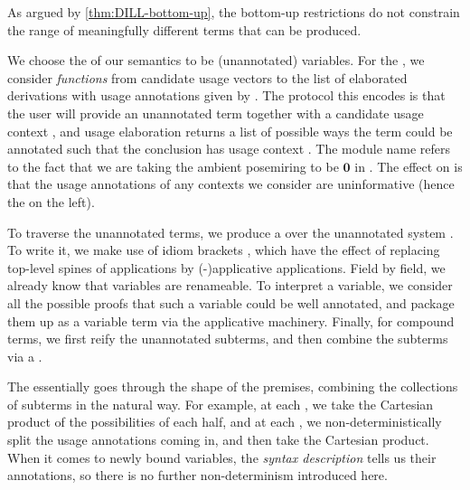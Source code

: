 \begin{example}
  \begin{samepage}
  \end{samepage}

  As argued by \cref{thm:DILL-bottom-up}, the bottom-up restrictions do not
  constrain the range of meaningfully different terms that can be produced.
\end{example}

We choose the \AgdaBound{$\V$} of our semantics to be (unannotated) variables.
For the \AgdaBound{$\C$}, we consider \emph{functions} from candidate usage
vectors  to the list of elaborated derivations with usage
annotations given by .
The protocol this encodes is that the user will provide an unannotated term
together with a candidate usage context , and usage elaboration
returns a list of possible ways the term could be annotated such that the
conclusion has usage context .
The module name  refers to the fact that we are taking the
ambient posemiring to be $\mathbf0$ in .
The effect on  is that the usage annotations of any
contexts we consider are uninformative (hence the \AgdaSymbol{\_} on the left).


To traverse the unannotated terms, we produce a  over the
unannotated system \AgdaSpace{}.
To write it, we make use of idiom brackets
\AgdaSymbol{\ensuremath{\llparenthesis}}\AgdaSpace{}\AgdaSymbol{$\ldots$}\AgdaSpace{}\AgdaSymbol{\ensuremath{\rrparenthesis}},
which have the effect of replacing top-level spines of applications by
(-)applicative applications.
Field by field, we already know that variables are renameable.
To interpret a variable, we consider all the possible proofs that such a
variable could be well annotated, and package them up as a variable term via
the applicative machinery.
Finally, for compound terms, we first reify the unannotated subterms, and then
combine the subterms via a .


The  essentially goes through the shape of the premises,
combining the collections of subterms in the natural way.
For example, at each
\AgdaInductiveConstructor{\AgdaUnderscore{}$\dottimes$\AgdaUnderscore{}},
we take the Cartesian product of the possibilities of each half, and at each
\AgdaInductiveConstructor{\AgdaUnderscore{}$\sep$\AgdaUnderscore{}},
we non-deterministically split the usage annotations coming in, and then take
the Cartesian product.
When it comes to newly bound variables, the \emph{syntax description} tells us
their annotations, so there is no further non-determinism introduced here.

